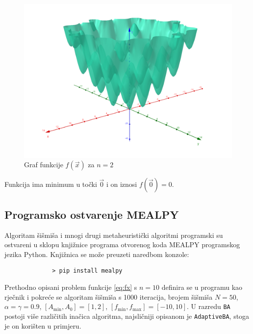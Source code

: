 \begin{figure}[H]
	\centering
	\includegraphics[width=14cm]{eggcrate_func.png}
	\caption{Graf funkcije $f(\vec{x})$ za $n = 2$} 
\end{figure}

Funkcija ima minimum u točki $\vec{0}$ i on iznosi $f(\vec{0}) = 0$. 


\subsection{Programsko ostvarenje MEALPY} \label{MP:Bat}
\hspace{\parindent}Algoritam šišmiša i mnogi drugi metaheuristički algoritmi programski su ostvareni u sklopu knjižnice programa otvorenog koda MEALPY\cite{van2023mealpy} programskog jezika Python. Knjižnica se može preuzeti naredbom konzole:

\begin{figure}[H]
	\begin{framed}
		\begin{footnotesize}
			\begin{verbatim}
		> pip install mealpy\end{verbatim}
		\end{footnotesize}
	\end{framed}
\end{figure}

\hspace{\parindent}Prethodno opisani problem funkcije \eqref{eq:fx} s $n = 10$ definira se u programu kao rječnik i pokreće se algoritam šišmiša s 1000 iteracija, brojem šišmiša $N = 50$,  $\alpha = \gamma = 0.9$, $[A_{\text{min}}, A_0] = [1, 2]$,  $[f_{\text{min}}, f_{\text{max}}] = [-10, 10]$. U razredu \verb|BA| postoji više različitih inačica algoritma, najsličniji opisanom je \verb|AdaptiveBA|, stoga je on korišten u primjeru.

